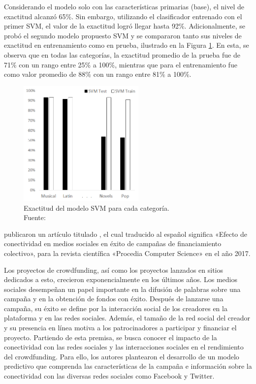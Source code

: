 Considerando el modelo solo con las características primarias (base), el nivel de exactitud alcanzó 65\%. Sin embargo, utilizando el clasificador entrenado con el primer SVM, el valor de la exactitud logró llegar hasta 92\%. Adicionalmente, se probó el segundo modelo propuesto SVM y se compararon tanto sus niveles de exactitud en entrenamiento como en prueba, ilustrado en la Figura \ref{2:fig119}. En esta, se observa que en todas las categorías, la exactitud promedio de la prueba fue de 71\% con un rango entre 25\% a 100\%, mientras que para el entrenamiento fue como valor promedio de 88\% con un rango entre 81\% a 100\%.

\begin{figure}[!ht]
	\begin{center}
		\includegraphics[width=0.55\textwidth]{2/figures/sawhney2016.png}
		\caption[Exactitud del modelo SVM para cada categoría]{Exactitud del modelo SVM para cada categoría.\\
			Fuente: \cite{pr_sawhney2016usingLT}}
		\label{2:fig119}
	\end{center}
\end{figure}

\newpage
\cite{pr_kaur2017socmedcrowd} publicaron un artículo titulado , el cual traducido al español significa «Efecto de conectividad en medios sociales en éxito de campañas de financiamiento colectivo», para la revista científica «Procedia Computer Science» en el año 2017.

Los proyectos de crowdfunding, así como los proyectos lanzados en sitios dedicados a esto, crecieron exponencialmente en los últimos años. Los medios sociales desempeñan un papel importante en la difusión de palabras sobre una campaña y en la obtención de fondos con éxito. Después de lanzarse una campaña, su éxito se define por la interacción social de los creadores en la plataforma y en las redes sociales. Además, el tamaño de la red social del creador y su presencia en línea motiva a los patrocinadores a participar y financiar el proyecto. Partiendo de esta premisa, se busca conocer el impacto de la conectividad con las redes sociales y las interacciones sociales en el rendimiento del crowdfunding. Para ello, los autores plantearon el desarrollo de un modelo predictivo que comprenda las características de la campaña e información sobre la conectividad con las diversas redes sociales como Facebook y Twitter.

